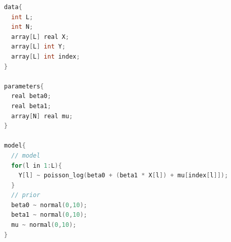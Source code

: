 \begin{lstlisting}[language=C++,label={stan::25_01},caption={個人差を含んだポアソン回帰モデル}]
data{
  int L;
  int N;
  array[L] real X;
  array[L] int Y;
  array[L] int index;
}

parameters{
  real beta0;
  real beta1;
  array[N] real mu;
}

model{
  // model
  for(l in 1:L){
    Y[l] ~ poisson_log(beta0 + (beta1 * X[l]) + mu[index[l]]);
  }
  // prior
  beta0 ~ normal(0,10);
  beta1 ~ normal(0,10);
  mu ~ normal(0,10);
}

\end{lstlisting}
